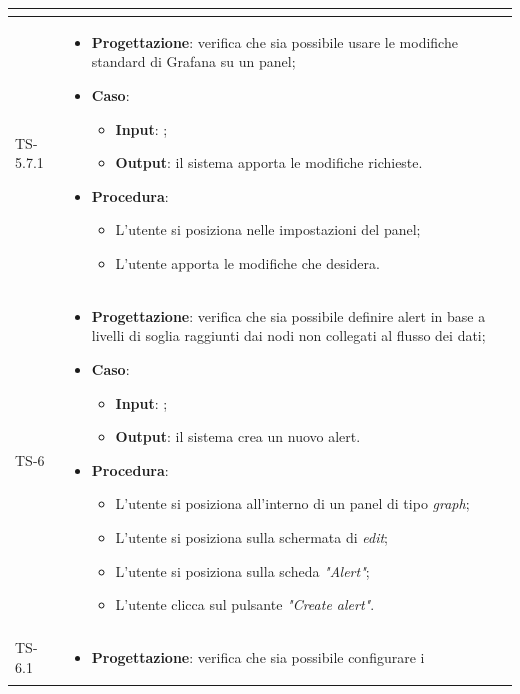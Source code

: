 \begin{longtable}{|C{2.5cm}|C{13cm}|}
\begin{itemize}
\end{itemize}
	 \\
	\hline
	{TS-5.7.1} & 
\begin{itemize}
	\item \textbf{Progettazione}: verifica che sia possibile usare le
	modifiche standard di Grafana su un panel;
	\item \textbf{Caso}: 
	\begin{itemize}
		\item \textbf{Input}: ;
		\item \textbf{Output}: il sistema apporta le modifiche richieste.
	\end{itemize}
	\item \textbf{Procedura}:
	\begin{itemize}
		\item L'utente si posiziona nelle impostazioni del panel;
		\item L'utente apporta le modifiche che desidera.
	\end{itemize} 
\end{itemize}
	 \\
	\hline
	{TS-6} & 
\begin{itemize}
	\item \textbf{Progettazione}: verifica che sia  possibile definire alert in
	base a livelli di soglia raggiunti dai nodi non collegati al flusso dei dati;
	\item \textbf{Caso}: 
	\begin{itemize}
		\item \textbf{Input}: ;
		\item \textbf{Output}: il sistema crea un nuovo alert.
	\end{itemize}
	\item \textbf{Procedura}:
	\begin{itemize}
		\item L'utente si posiziona all'interno di un panel di tipo \emph{graph};
		\item L'utente si posiziona sulla schermata di \emph{edit};
		\item L'utente si posiziona sulla scheda \emph{"Alert"};
		\item L'utente clicca sul pulsante \emph{"Create alert"}.
	\end{itemize} 
\end{itemize}
	 \\
	\hline
	{TS-6.1} & 
\begin{itemize}
	\item \textbf{Progettazione}: verifica che sia possibile configurare i

\end{itemize}
\end{longtable}
